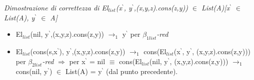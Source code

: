 \vspace{0.5cm}
\noindent
\normalsize \textit{Dimostrazione di correttezza di El$_{list}$(x$^\backprime$, y$^\backprime$,(x,y,z).cons(z,y)) $\in$ List(A)[x$^\backprime$ $\in$ List(A), y$^\backprime$ $\in$ A]}
\begin{itemize}
\item El$_{list}$(nil, y$^\backprime$,(x,y,z).cons(z,y)) $\rightarrow_1$ y$^\backprime$ per \textit{$\beta_{1list}$-red}
\item El$_{list}$(cons(s,x$^\backprime$), y$^\backprime$,(x,y,z).cons(z,y)) $\rightarrow_1$ cons(El$_{list}$(x$^\backprime$, y$^\backprime$, (x,y,z).cons(z,y))) per \textit{$\beta_{2list}$-red} $\Rightarrow$ per x$^\backprime$ = nil $\equiv$ cons(El$_{list}$(nil, y$^\backprime$, (x,y,z).cons(z,y))) $\rightarrow_1$ cons(nil, y$^\backprime$) $\in$ List(A) = y$^\backprime$ (dal punto precedente).
\end{itemize}



